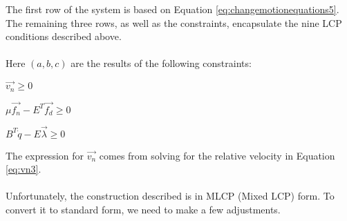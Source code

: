The first row of the system is based on Equation \ref{eq:changemotionequations5}. The remaining three rows, as well as the constraints, encapsulate the nine LCP conditions described above.
\\
\\
Here $(a, b, c)$ are the results of the following constraints: 
\begin{packed_item}
\item $\vec{v_n} \geq 0$
\item $\mu\vec{f_n} - E^T\vec{f_d} \geq 0$
\item $B^T\dot{q} - E\vec{\lambda} \geq 0$
\end{packed_item}
The expression for $\vec{v_n}$ comes from solving for the relative velocity in Equation \ref{eq:vn3}.
\\
\\
Unfortunately, the construction described is in MLCP (Mixed LCP) form. To convert it to standard form, we need to make a few adjustments.